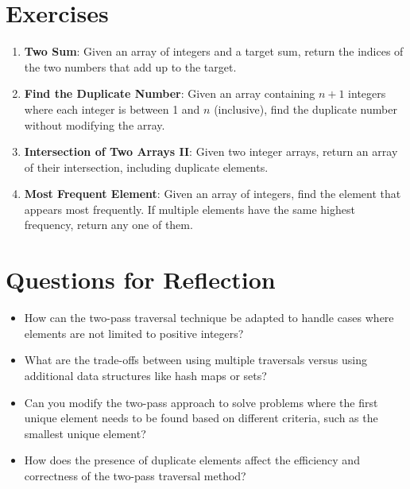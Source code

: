 \section*{Exercises}

\begin{enumerate}
    \item \textbf{Two Sum}: Given an array of integers and a target sum, return the indices of the two numbers that add up to the target.
    
    \item \textbf{Find the Duplicate Number}: Given an array containing \(n + 1\) integers where each integer is between 1 and \(n\) (inclusive), find the duplicate number without modifying the array.
    
    \item \textbf{Intersection of Two Arrays II}: Given two integer arrays, return an array of their intersection, including duplicate elements.
    
    \item \textbf{Most Frequent Element}: Given an array of integers, find the element that appears most frequently. If multiple elements have the same highest frequency, return any one of them.
\end{enumerate}

\section*{Questions for Reflection}

\begin{itemize}
    \item How can the two-pass traversal technique be adapted to handle cases where elements are not limited to positive integers?
    
    \item What are the trade-offs between using multiple traversals versus using additional data structures like hash maps or sets?
    
    \item Can you modify the two-pass approach to solve problems where the first unique element needs to be found based on different criteria, such as the smallest unique element?
    
    \item How does the presence of duplicate elements affect the efficiency and correctness of the two-pass traversal method?
\end{itemize}